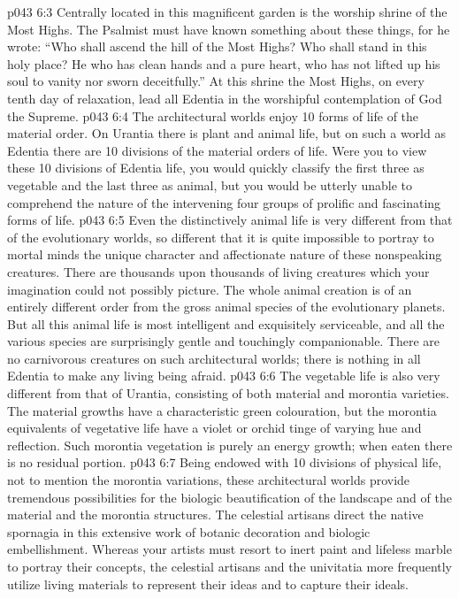 \vs p043 6:3 Centrally located in this magnificent garden is the worship shrine of the Most Highs. The Psalmist must have known something about these things, for he wrote: “Who shall ascend the hill of the Most Highs? Who shall stand in this holy place? He who has clean hands and a pure heart, who has not lifted up his soul to vanity nor sworn deceitfully.” At this shrine the Most Highs, on every tenth day of relaxation, lead all Edentia in the worshipful contemplation of God the Supreme.
\vs p043 6:4 \pc The architectural worlds enjoy 10 forms of life of the material order. On Urantia there is plant and animal life, but on such a world as Edentia there are 10 divisions of the material orders of life. Were you to view these 10 divisions of Edentia life, you would quickly classify the first three as vegetable and the last three as animal, but you would be utterly unable to comprehend the nature of the intervening four groups of prolific and fascinating forms of life.
\vs p043 6:5 Even the distinctively animal life is very different from that of the evolutionary worlds, so different that it is quite impossible to portray to mortal minds the unique character and affectionate nature of these nonspeaking creatures. There are thousands upon thousands of living creatures which your imagination could not possibly picture. The whole animal creation is of an entirely different order from the gross animal species of the evolutionary planets. But all this animal life is most intelligent and exquisitely serviceable, and all the various species are surprisingly gentle and touchingly companionable. There are no carnivorous creatures on such architectural worlds; there is nothing in all Edentia to make any living being afraid.
\vs p043 6:6 The vegetable life is also very different from that of Urantia, consisting of both material and morontia varieties. The material growths have a characteristic green colouration, but the morontia equivalents of vegetative life have a violet or orchid tinge of varying hue and reflection. Such morontia vegetation is purely an energy growth; when eaten there is no residual portion.
\vs p043 6:7 Being endowed with 10 divisions of physical life, not to mention the morontia variations, these architectural worlds provide tremendous possibilities for the biologic beautification of the landscape and of the material and the morontia structures. The celestial artisans direct the native spornagia in this extensive work of botanic decoration and biologic embellishment. Whereas your artists must resort to inert paint and lifeless marble to portray their concepts, the celestial artisans and the univitatia more frequently utilize living materials to represent their ideas and to capture their ideals.
